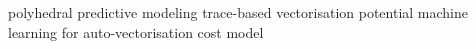 polyhedral predictive modeling\cite{park.13.ijpp}
trace-based vectorisation potential\cite{holewinski.12.pldi}
machine learning for auto-vectorisation\cite{stock.12.taco}
cost model\cite{5608348}



